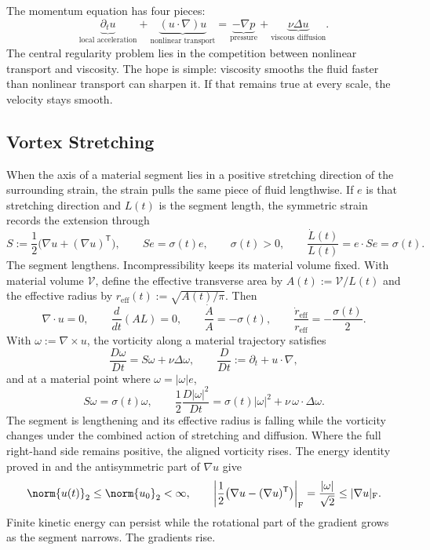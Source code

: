 
The momentum equation has four pieces:
\[
  \underbrace{\partial_t u}_{\text{local acceleration}}
  +
  \underbrace{(u\cdot\nabla)u}_{\text{nonlinear transport}}
  =
  \underbrace{-\nabla p}_{\text{pressure}}
  +
  \underbrace{\nu\Delta u}_{\text{viscous diffusion}}.
\]
The central regularity problem lies in the competition between nonlinear transport and viscosity.
The hope is simple: viscosity smooths the fluid faster than nonlinear transport can sharpen it.
If that remains true at every scale, the velocity stays smooth.

\subsection{Vortex Stretching}\label{sub:ThePerfectlyStretchingVortex}

When the axis of a material segment lies in a positive stretching direction of the surrounding strain, the strain pulls the same piece of fluid lengthwise. If \(e\) is that stretching direction and \(L(t)\) is the segment length, the symmetric strain records the extension through
\[
  S:=\frac12\bigl(\nabla u+(\nabla u)^{\mathsf T}\bigr),
  \qquad
  Se=\sigma(t)e,
  \qquad
  \sigma(t)>0,
  \qquad
  \frac{\dot L(t)}{L(t)}
  =
  e\cdot Se
  =
  \sigma(t).
\]
The segment lengthens. Incompressibility keeps its material volume fixed. With material volume \(\mathcal V\), define the effective transverse area by \(A(t):=\mathcal V/L(t)\) and the effective radius by \(r_{\mathrm{eff}}(t):=\sqrt{A(t)/\pi}\). Then
\[
  \nabla\cdot u=0,
  \qquad
  \frac{d}{dt}(A L)=0,
  \qquad
  \frac{\dot A}{A}=-\sigma(t),
  \qquad
  \frac{\dot r_{\mathrm{eff}}}{r_{\mathrm{eff}}}
  =
  -\frac{\sigma(t)}{2}.
\]
With \(\omega:=\nabla\times u\), the vorticity along a material trajectory satisfies
\[
  \frac{D\omega}{Dt}
  =
  S\omega+\nu\Delta\omega,
  \qquad
  \frac{D}{Dt}
  :=
  \partial_t+u\cdot\nabla,
\]
and at a material point where \(\omega=|\omega|e\),
\[
  S\omega
  =
  \sigma(t)\omega,
  \qquad
  \frac12\frac{D|\omega|^2}{Dt}
  =
  \sigma(t)|\omega|^2
  +
  \nu\,\omega\cdot\Delta\omega.
\]
The segment is lengthening and its effective radius is falling while the vorticity changes under the combined action of stretching and diffusion. Where the full right-hand side remains positive, the aligned vorticity rises. The energy identity proved in  and the antisymmetric part of \(\nabla u\) give
\[
  \norm{u(t)}_2
  \leq
  \norm{u_0}_2
  <\infty,
  \qquad
  \left|\frac12\bigl(\nabla u-(\nabla u)^{\mathsf T}\bigr)\right|_{\mathrm F}
  =
  \frac{|\omega|}{\sqrt2}
  \leq
  |\nabla u|_{\mathrm F}.
\]
Finite kinetic energy can persist while the rotational part of the gradient grows as the segment narrows. The gradients rise.

